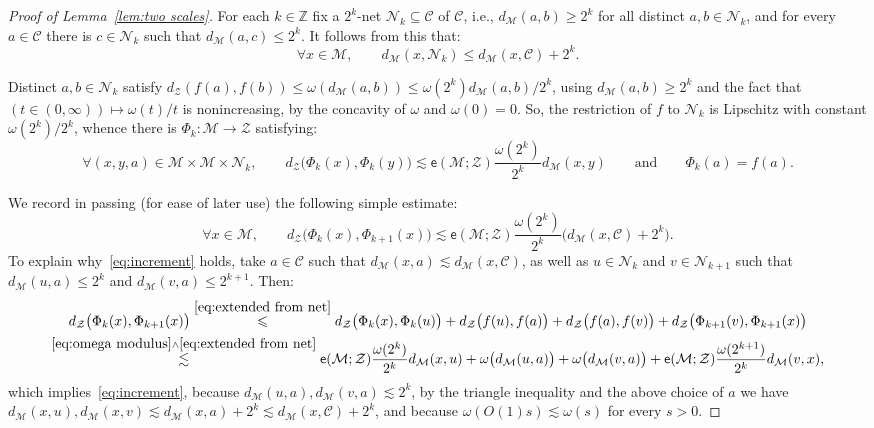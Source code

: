\documentclass[11pt,reqno]{amsart}
\newcommand{\Z}{\mathbb{Z}}
\renewcommand{\le}{\leqslant}
\renewcommand{\ge}{\geqslant}
\renewcommand{\subset}{\subseteq}
\newcommand{\ee}{\mathsf{e}}
\newcommand{\cZ}{\mathcal{Z}}
\newcommand{\NN}{\mathcal{N}}
\newcommand{\MM}{\mathcal{M}}
\newcommand{\sub}{\mathscr{C}}
\begin{document}
\begin{proof}[Proof of Lemma~\ref{lem:two scales}] For each $k\in \Z$ fix a $2^k$-net $\NN_k\subset \sub$ of $\sub$, i.e., $d_\MM(a,b)\ge 2^k$ for all distinct $a,b\in \NN_k$, and for every $a\in \sub$ there is $c\in \NN_k$ such that $d_\MM(a,c)\le 2^k$. It follows from this that:
\begin{equation}\label{eq:distance from outside to net in C}
\forall x\in \MM,\qquad d_\MM(x,\NN_k)\le d_\MM(x,\sub)+2^k.
\end{equation}


Distinct $a,b\in \NN_k$ satisfy $d_\cZ(f(a),f(b))\le \omega(d_\MM(a,b))\le \omega(2^k)d_\MM(a,b)/2^k$, using $d_\MM(a,b)\ge 2^k$ and the fact that $(t\in (0,\infty))\mapsto \omega(t)/t$ is nonincreasing, by the concavity of $\omega$ and $\omega(0)=0$.     So, the restriction of $f$ to $\NN_k$ is Lipschitz with constant $\omega(2^k)/2^k$, whence there is $\Phi_k:\MM\to \cZ$ satisfying: 
\begin{equation}\label{eq:extended from net}
\forall (x,y,a)\in \MM\times \MM\times \NN_k,\qquad d_\cZ\big(\Phi_k(x),\Phi_k(y)\big)\lesssim \ee(\MM;\cZ)\frac{\omega(2^k)}{2^k}d_\MM(x,y)\qquad\mathrm{and}\qquad \Phi_k(a)=f(a). 
\end{equation}


We record in passing (for ease of later use) the following simple estimate:
\begin{equation}\label{eq:increment}
\forall x\in \MM,\qquad d_\cZ\big(\Phi_k(x),\Phi_{k+1}(x)\big)\lesssim \ee(\MM;\cZ)\frac{\omega(2^k)}{2^k} \big(d_\MM(x,\sub)+2^k\big).
\end{equation}
To explain why~\eqref{eq:increment} holds, take $a\in \sub$ such that $d_\MM(x,a)\lesssim d_\MM(x,\sub)$, as well as $u\in \NN_k$ and $v\in \NN_{k+1}$ such that $d_\MM(u,a)\le 2^k$ and $d_\MM(v,a)\le 2^{k+1}$.  Then:
\begin{multline*}
d_\cZ\big(\Phi_k(x),\Phi_{k+1}(x)\big)\stackrel{\eqref{eq:extended from net}}{\le} d_\cZ\big(\Phi_k(x),\Phi_k(u)\big)+d_\cZ\big(f(u),f(a)\big)+d_\cZ\big(f(a),f(v)\big)+d_\cZ\big(\Phi_{k+1}(v),\Phi_{k+1}(x)\big)\\
\stackrel{\eqref{eq:omega modulus}\wedge \eqref{eq:extended from net}}{\lesssim} \ee(\MM;\cZ)\frac{\omega(2^k)}{2^k} d_\MM(x,u)+\omega\big(d_\MM(u,a)\big)+\omega\big(d_\MM(v,a)\big)+\ee(\MM;\cZ)\frac{\omega(2^{k+1})}{2^k} d_\MM(v,x),
\end{multline*}
which implies~\eqref{eq:increment}, because $d_\MM(u,a),d_\MM(v,a)\lesssim 2^k$,  by the triangle inequality and the above choice of $a$ we have $d_\MM(x,u),d_\MM(x,v)\lesssim d_\MM(x,a)+2^k\lesssim d_\MM(x,\sub)+2^k$, and because $\omega(O(1)s)\lesssim \omega(s)$ for every $s>0$. 


\end{proof}
\end{document}
